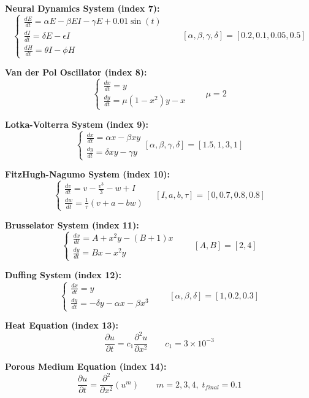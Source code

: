 \textbf{Neural Dynamics System (index 7):} 
\[
\begin{cases}
\frac{dE}{dt} = \alpha E - \beta E I - \gamma E + 0.01 \sin(t) \\
\frac{dI}{dt} = \delta E - \epsilon I \\
\frac{dH}{dt} = \theta I - \phi H
\end{cases} \qquad [\alpha, \beta, \gamma, \delta] = [0.2 ,0.1 ,0.05 , 0.5]
\]

\textbf{Van der Pol Oscillator (index 8):} 
\[
\begin{cases}
\frac{dx}{dt} = y \\
\frac{dy}{dt} = \mu (1 - x^2) y - x
\end{cases} \qquad \mu = 2
\]

\textbf{Lotka-Volterra System (index 9):} 
\[
\begin{cases}
\frac{dx}{dt} = \alpha x - \beta x y \\
\frac{dy}{dt} = \delta x y - \gamma y
\end{cases} [\alpha, \beta, \gamma, \delta] = [1.5, 1, 3, 1]
\]

\textbf{FitzHugh-Nagumo System (index 10):} 
\[
\begin{cases}
\frac{dv}{dt} = v - \frac{v^3}{3} - w + I \\
\frac{dw}{dt} = \frac{1}{\tau} \left( v + a - b w \right)
\end{cases} \quad [I, a, b, \tau] = [0, 0.7, 0.8, 0.8]
\]

\textbf{Brusselator System (index 11):} 
\[
\begin{cases}
\frac{dx}{dt} = A + x^2 y - (B + 1) x \\
\frac{dy}{dt} = B x - x^2 y
\end{cases} \qquad [A,B] = [2,4]
\]

\textbf{Duffing System (index 12):} 
\[
\begin{cases}
\frac{dx}{dt} = y \\
\frac{dy}{dt} = -\delta y - \alpha x - \beta x^3
\end{cases} \qquad [\alpha, \beta, \delta] = [1, 0.2, 0.3]
\]

\textbf{Heat Equation (index 13):} 
\[
\frac{\partial u}{\partial t} = c_1 \frac{\partial^2 u}{\partial x^2} \qquad c_1 = 3\times 10^{-3}
\] 

\textbf{Porous Medium Equation (index 14):} 
\[
\frac{\partial u}{\partial t} = \frac{\partial^2}{\partial x^2} \left( u^m \right) \qquad m = 2,3,4, \; t_{final} = 0.1
\]

